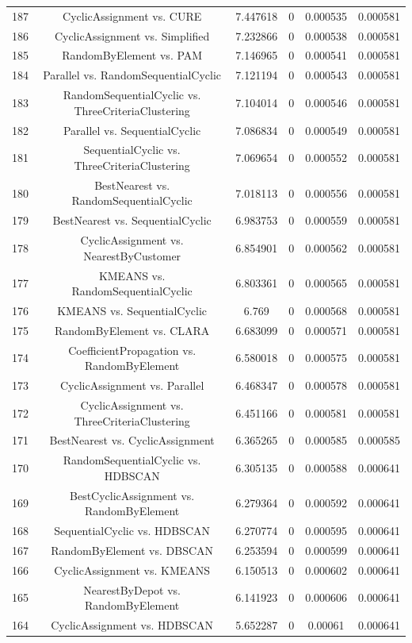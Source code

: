 \documentclass[a4paper,10pt]{article}
\begin{document}
\begin{landscape}
\begin{table}[!htp]
\begin{tabular}{cccccc}
187&CyclicAssignment vs. CURE&7.447618&0&0.000535&0.000581\\
186&CyclicAssignment vs. Simplified&7.232866&0&0.000538&0.000581\\
185&RandomByElement vs. PAM&7.146965&0&0.000541&0.000581\\
184&Parallel vs. RandomSequentialCyclic&7.121194&0&0.000543&0.000581\\
183&RandomSequentialCyclic vs. ThreeCriteriaClustering&7.104014&0&0.000546&0.000581\\
182&Parallel vs. SequentialCyclic&7.086834&0&0.000549&0.000581\\
181&SequentialCyclic vs. ThreeCriteriaClustering&7.069654&0&0.000552&0.000581\\
180&BestNearest vs. RandomSequentialCyclic&7.018113&0&0.000556&0.000581\\
179&BestNearest vs. SequentialCyclic&6.983753&0&0.000559&0.000581\\
178&CyclicAssignment vs. NearestByCustomer&6.854901&0&0.000562&0.000581\\
177&KMEANS vs. RandomSequentialCyclic&6.803361&0&0.000565&0.000581\\
176&KMEANS vs. SequentialCyclic&6.769&0&0.000568&0.000581\\
175&RandomByElement vs. CLARA&6.683099&0&0.000571&0.000581\\
174&CoefficientPropagation vs. RandomByElement&6.580018&0&0.000575&0.000581\\
173&CyclicAssignment vs. Parallel&6.468347&0&0.000578&0.000581\\
172&CyclicAssignment vs. ThreeCriteriaClustering&6.451166&0&0.000581&0.000581\\
171&BestNearest vs. CyclicAssignment&6.365265&0&0.000585&0.000585\\
170&RandomSequentialCyclic vs. HDBSCAN&6.305135&0&0.000588&0.000641\\
169&BestCyclicAssignment vs. RandomByElement&6.279364&0&0.000592&0.000641\\
168&SequentialCyclic vs. HDBSCAN&6.270774&0&0.000595&0.000641\\
167&RandomByElement vs. DBSCAN&6.253594&0&0.000599&0.000641\\
166&CyclicAssignment vs. KMEANS&6.150513&0&0.000602&0.000641\\
165&NearestByDepot vs. RandomByElement&6.141923&0&0.000606&0.000641\\
164&CyclicAssignment vs. HDBSCAN&5.652287&0&0.00061&0.000641\\

\end{tabular}
\end{table}
\end{landscape}
\end{document}
